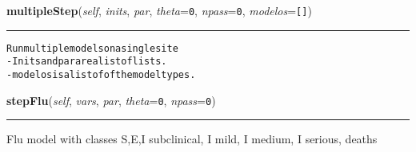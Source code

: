     \label{Epigrass:simobj:popmodels:multipleStep}

    \vspace{0.5ex}

    \begin{boxedminipage}{\textwidth}

    \raggedright \textbf{multipleStep}(\textit{self}, \textit{inits}, \textit{par}, \textit{theta}=\texttt{0}, \textit{npass}=\texttt{0}, \textit{modelos}=\texttt{[]})

    \vspace{-1.5ex}

    \rule{\textwidth}{0.5\fboxrule}
\begin{alltt}

Run multiple models on a single site
- Inits and par are a list of lists.
- modelos is a list of of the modeltypes.
\end{alltt}

    \vspace{1ex}

    \end{boxedminipage}

    \label{Epigrass:simobj:popmodels:stepFlu}

    \vspace{0.5ex}

    \begin{boxedminipage}{\textwidth}

    \raggedright \textbf{stepFlu}(\textit{self}, \textit{vars}, \textit{par}, \textit{theta}=\texttt{0}, \textit{npass}=\texttt{0})

    \vspace{-1.5ex}

    \rule{\textwidth}{0.5\fboxrule}
    Flu model with classes S,E,I subclinical, I mild, I medium, I serious, 
    deaths

    \vspace{1ex}

    \end{boxedminipage}

    \label{Epigrass:simobj:popmodels:stepSIS}

